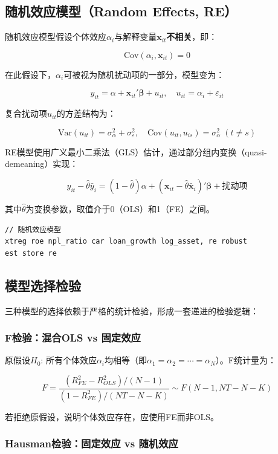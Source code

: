 \subsection{随机效应模型（Random Effects, RE）}

随机效应模型假设个体效应$\alpha_i$与解释变量$\mathbf{x}_{it}$\textbf{不相关}，即：

\[
\text{Cov}(\alpha_i, \mathbf{x}_{it}) = 0
\]

在此假设下，$\alpha_i$可被视为随机扰动项的一部分，模型变为：

\[
y_{it} = \alpha + \mathbf{x}_{it}'\boldsymbol{\beta} + u_{it}, \quad u_{it} = \alpha_i + \varepsilon_{it}
\]

复合扰动项$u_{it}$的方差结构为：

\[
\text{Var}(u_{it}) = \sigma_\alpha^2 + \sigma_\varepsilon^2, \quad \text{Cov}(u_{it}, u_{is}) = \sigma_\alpha^2 \;(t \neq s)
\]

RE模型使用广义最小二乘法（GLS）估计，通过部分组内变换（quasi-demeaning）实现：

\[
y_{it} - \hat{\theta}\bar{y}_i = (1-\hat{\theta})\alpha + (\mathbf{x}_{it} - \hat{\theta}\bar{\mathbf{x}}_i)'\boldsymbol{\beta} + \text{扰动项}
\]

其中$\hat{\theta}$为变换参数，取值介于0（OLS）和1（FE）之间。

\begin{lstlisting}[style=stata]
// 随机效应模型
xtreg roe npl_ratio car loan_growth log_asset, re robust
est store re
\end{lstlisting}

\subsection{模型选择检验}

三种模型的选择依赖于严格的统计检验，形成一套递进的检验逻辑：

\subsubsection{F检验：混合OLS vs 固定效应}

原假设$H_0$: 所有个体效应$\alpha_i$均相等（即$\alpha_1 = \alpha_2 = \cdots = \alpha_N$）。F统计量为：

\[
F = \frac{(R_{FE}^2 - R_{OLS}^2)/(N-1)}{(1-R_{FE}^2)/(NT-N-K)} \sim F(N-1, NT-N-K)
\]

若拒绝原假设，说明个体效应存在，应使用FE而非OLS。

\subsubsection{Hausman检验：固定效应 vs 随机效应}

